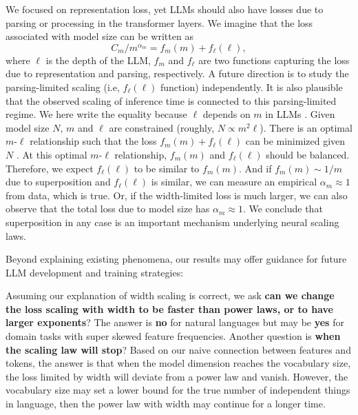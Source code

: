 \documentclass{article}
\begin{document}
We focused on representation loss, yet LLMs should also have losses due to parsing or processing in the transformer layers. We imagine that the loss associated with model size can be written as
\begin{equation}
    C_m / m^{\alpha_m} = f_m(m) + f_\ell (\ell),
\end{equation}
where $\ell$ is the depth of the LLM, $f_m$ and $f_\ell$ are two functions capturing the loss due to representation and parsing, respectively. A future direction is to study the parsing-limited scaling (i.e, $f_\ell (\ell)$ function) independently. It is also plausible that the observed scaling of inference time \cite{snell2024scalingllmtesttimecompute} is connected to this parsing-limited regime. We here write the equality because $\ell$ depends on $m$ in LLMs \cite{zhang2022opt,radford2019language,qwen2.5,biderman2023pythia}. Given model size $N$, $m$ and $\ell$ are constrained (roughly, $N\propto m^2 \ell$). There is an optimal $m$-$\ell$ relationship such that the loss $f_m(m) + f_\ell (\ell)$ can be minimized given $N$ \cite{levine2020depth}. At this optimal $m$-$\ell$ relationship, $f_m(m)$ and $f_\ell (\ell)$ should be balanced. Therefore, we expect $f_\ell (\ell)$ to be similar to $f_m(m)$. And if $f_m(m) \sim 1/m$ due to superposition and $f_\ell (\ell)$ is similar, we can measure an empirical $\alpha_m \approx 1$ from data, which is true. Or, if the width-limited loss is much larger, we can also observe that the total loss due to model size has $\alpha_m \approx 1$. We conclude that superposition in any case is an important mechanism underlying neural scaling laws.

Beyond explaining existing phenomena, our results may offer guidance for future LLM development and training strategies:
\vspace{-5pt}
\begin{tcolorbox}[colframe=mitred, opacityback=0.9]
    Assuming our explanation of width scaling is correct, we ask \textbf{can we change the loss scaling with width to be faster than power laws, or to have larger exponents}? The answer is \textbf{no} for natural languages but may be \textbf{yes} for domain tasks with super skewed feature frequencies. Another question is \textbf{when the scaling law will stop}? Based on our naive connection between features and tokens, the answer is that when the model dimension reaches the vocabulary size, the loss limited by width will deviate from a power law and vanish. However, the vocabulary size may set a lower bound for the true number of independent things in language, then the power law with width may continue for a longer time.
\end{tcolorbox}
\end{document}
